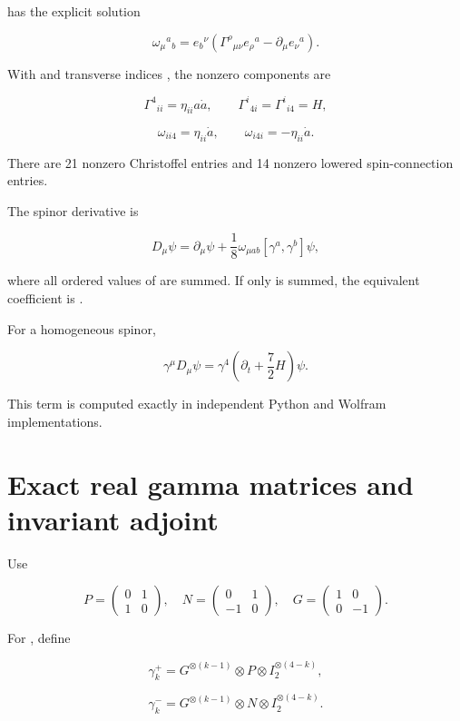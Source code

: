 \documentclass[11pt]{article}
\begin{document}
has the explicit solution

\[
\omega_\mu{}^a{}_b
=e_b{}^\nu\left(
\Gamma^\rho{}_{\mu\nu}e_\rho{}^a
-\partial_\mu e_\nu{}^a\right).
\]

With \texttt{} and transverse indices \texttt{}, the nonzero components are

\[
\Gamma^4{}_{ii}=\eta_{ii}a\dot a,
\qquad
\Gamma^i{}_{4i}=\Gamma^i{}_{i4}=H,
\]

\[
\omega_{ii4}=\eta_{ii}\dot a,
\qquad
\omega_{i4i}=-\eta_{ii}\dot a.
\]

There are 21 nonzero Christoffel entries and 14 nonzero lowered spin-connection entries.

The spinor derivative is

\[
D_\mu\psi
=\partial_\mu\psi
+\frac18\omega_{\mu ab}[\gamma^a,\gamma^b]\psi,
\]

where all ordered values of \texttt{} are summed. If only \texttt{} is summed, the equivalent coefficient is \texttt{}.

For a homogeneous spinor,

\[
\gamma^\mu D_\mu\psi
=\gamma^4\left(\partial_t+\frac72H\right)\psi.
\]

This \texttt{} term is computed exactly in independent Python and Wolfram implementations.

\section{Exact real gamma matrices and invariant adjoint}

Use

\[
P=\begin{pmatrix}0&1\\1&0\end{pmatrix},
\quad
N=\begin{pmatrix}0&1\\-1&0\end{pmatrix},
\quad
G=\begin{pmatrix}1&0\\0&-1\end{pmatrix}.
\]

For \texttt{}, define

\[
\gamma_k^+=G^{\otimes(k-1)}\otimes P\otimes I_2^{\otimes(4-k)},
\]

\[
\gamma_k^-=G^{\otimes(k-1)}\otimes N\otimes I_2^{\otimes(4-k)}.
\]
\end{document}
